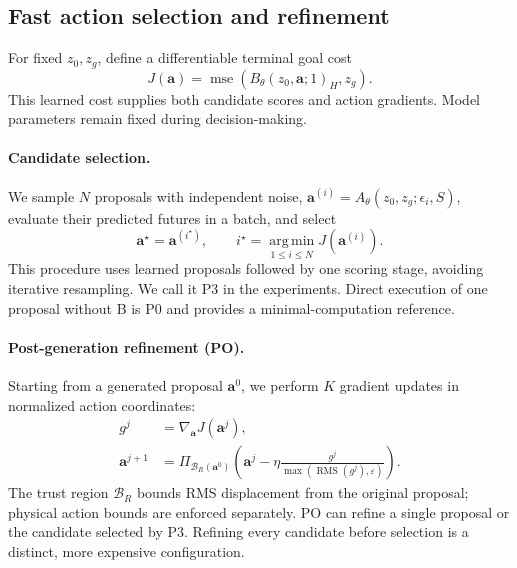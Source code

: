 \subsection{Fast action selection and refinement}
\label{sec:planning}
For fixed $z_0,z_g$, define a differentiable terminal goal cost
\begin{equation}
 J(\mathbf a)=\operatorname{mse}\left(B_\theta(z_0,\mathbf a;1)_H,z_g\right).
 \label{eq:score}
\end{equation}
This learned cost supplies both candidate scores and action gradients. Model parameters remain fixed during decision-making.

\paragraph{Candidate selection.}
We sample $N$ proposals with independent noise, $\mathbf a^{(i)}=A_\theta(z_0,z_g;\epsilon_i,S)$, evaluate their predicted futures in a batch, and select
\begin{equation}
 \mathbf a^\star=\mathbf a^{(i^\star)},\qquad
 i^\star=\operatorname*{arg\,min}_{1\leq i\leq N}J(\mathbf a^{(i)}).
\end{equation}
This procedure uses learned proposals followed by one scoring stage, avoiding iterative resampling. We call it P3 in the experiments. Direct execution of one proposal without B is P0 and provides a minimal-computation reference.

\paragraph{Post-generation refinement (PO).}
Starting from a generated proposal $\mathbf a^0$, we perform $K$ gradient updates in normalized action coordinates:
\begin{equation}
 \begin{split}
 g^j&=\nabla_{\mathbf a}J(\mathbf a^j),\\
 \mathbf a^{j+1}&=\Pi_{\mathcal B_R(\mathbf a^0)}\left(
 \mathbf a^j-\eta\frac{g^j}{\max(\operatorname{RMS}(g^j),\varepsilon)}\right).
 \end{split}
 \label{eq:po}
\end{equation}
The trust region $\mathcal B_R$ bounds RMS displacement from the original proposal; physical action bounds are enforced separately. PO can refine a single proposal or the candidate selected by P3. Refining every candidate before selection is a distinct, more expensive configuration.


